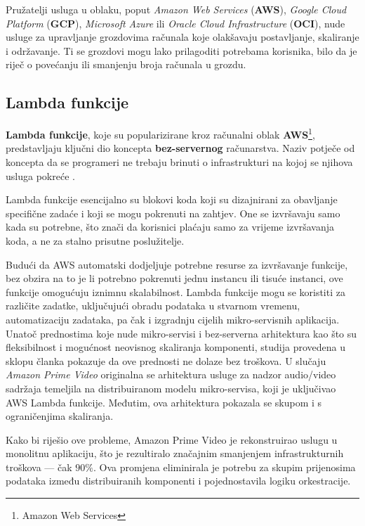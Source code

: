 \documentclass[times, utf8, diplomski]{fer}
\begin{document}
Pružatelji usluga u oblaku, poput \emph{Amazon Web Services} (\textbf{AWS}), \emph{Google Cloud Platform} (\textbf{GCP}), \emph{Microsoft Azure} ili \emph{Oracle Cloud Infrastructure} (\textbf{OCI}), nude usluge za upravljanje grozdovima računala koje olakšavaju postavljanje, skaliranje i održavanje. Ti se grozdovi mogu lako prilagoditi potrebama korisnika, bilo da je riječ o povećanju ili smanjenju broja računala u grozdu.

\subsection{Lambda funkcije}

\textbf{Lambda funkcije}, koje su popularizirane kroz računalni oblak \textbf{AWS}\footnote{Amazon Web Services}, predstavljaju ključni dio koncepta \textbf{bez-servernog}  računarstva. Naziv potječe od koncepta da se programeri ne trebaju brinuti o infrastrukturi na kojoj se njihova usluga pokreće \citep{cloudflare_why_2023}.

Lambda funkcije esencijalno su blokovi koda koji su dizajnirani za obavljanje specifične zadaće i koji se mogu pokrenuti na zahtjev. One se izvršavaju samo kada su potrebne, što znači da korisnici plaćaju samo za vrijeme izvršavanja koda, a ne za stalno prisutne poslužitelje.

Budući da AWS automatski dodjeljuje potrebne resurse za izvršavanje funkcije, bez obzira na to je li potrebno pokrenuti jednu instancu ili tisuće instanci, ove funkcije omogućuju iznimnu skalabilnost. Lambda funkcije mogu se koristiti za različite zadatke, uključujući obradu podataka u stvarnom vremenu, automatizaciju zadataka, pa čak i izgradnju cijelih mikro-servisnih aplikacija. \\

Unatoč prednostima koje nude mikro-servisi i bez-serverna  arhitektura kao što su fleksibilnost i mogućnost neovisnog skaliranja komponenti, studija provedena u sklopu članka \citet{kolny_scaling_2023} pokazuje da ove prednosti ne dolaze bez troškova. U slučaju \emph{Amazon Prime Video} originalna se arhitektura usluge za nadzor audio/video sadržaja temeljila na distribuiranom modelu mikro-servisa, koji je uključivao AWS Lambda funkcije. Međutim, ova arhitektura pokazala se skupom i s ograničenjima skaliranja.

Kako bi riješio ove probleme, Amazon Prime Video je rekonstruirao uslugu u monolitnu aplikaciju, što je rezultiralo značajnim smanjenjem infrastrukturnih troškova --- čak $90\%$. Ova promjena eliminirala je potrebu za skupim prijenosima podataka između distribuiranih komponenti i pojednostavila logiku orkestracije.
\end{document}
